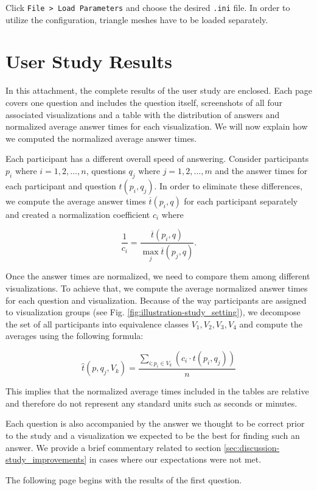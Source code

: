 Click \verb+File > Load Parameters+ and choose the desired \verb+.ini+ file. In order to utilize the configuration, triangle meshes have to be loaded separately.

\clearpage

\section{User Study Results}
\label{attch:complete_study_results}

In this attachment, the complete results of the user study are enclosed. Each page covers one question and includes the question itself, screenshots of all four associated visualizations and a table with the distribution of answers and normalized average answer times for each visualization. We will now explain how we computed the normalized average answer times.

Each participant has a different overall speed of answering. Consider participants \(p_i \text{ where } i = 1, 2, \dotsc, n\), questions \(q_j \text{ where } j = 1, 2, \dotsc, m\) and the answer times for each participant and question \(t(p_i,q_j)\). In order to eliminate these differences, we compute the average answer times \(\overline{t}(p_i,q)\) for each participant separately and created a normalization coefficient \(c_i\) where

\[\frac{1}{c_i} = \frac{\overline{t}(p_i,q)}{{\max_{j} \overline{t}(p_j,q)}}.\] 

Once the answer times are normalized, we need to compare them among different visualizations. To achieve that, we compute the average normalized answer times for each question and visualization. Because of the way participants are assigned to visualization groups (see Fig. \ref{fig:illustration-study_setting}), we decompose the set of all participants into equivalence classes \(V_1,V_2,V_3,V_4\) and compute the averages using the following formula:

\[\widehat{t}(p,q_j,V_k) = \frac{\sum_{i; p_i \in V_k}^{}(c_i \cdot t(p_i,q_j))}{n}\]

This implies that the normalized average times included in the tables are relative and therefore do not represent any standard units such as seconds or minutes.

Each question is also accompanied by the answer we thought to be correct prior to the study and a visualization we expected to be the best for finding such an answer. We provide a brief commentary related to section \ref{sec:discussion-study_improvements} in cases where our expectations were not met.

The following page begins with the results of the first question.
\clearpage

